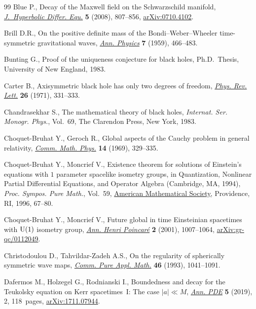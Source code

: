 \documentclass[pdftex]{sigma}
\numberwithin{equation}{section}
\begin{document}
\begin{thebibliography}{99}
Blue P., Decay of the {M}axwell field on the {S}chwarzschild manifold,
 \href{https://doi.org/10.1142/S0219891608001714}{\textit{J.~Hyperbolic
 Differ. Equ.}} \textbf{5} (2008), 807--856,
 \href{http://arxiv.org/abs/0710.4102}{arXiv:0710.4102}.

Brill D.R., On the positive definite mass of the {B}ondi--{W}eber--{W}heeler
 time-symmetric gravitational waves,
 \href{https://doi.org/10.1016/0003-4916(59)90055-7}{\textit{Ann. Physics}}
 \textbf{7} (1959), 466--483.

Bunting G., Proof of the uniqueness conjecture for black holes, Ph.D.~Thesis, {U}niversity of New England, 1983.

Carter B., Axisymmetric black hole has only two degrees of freedom,
 \href{https://doi.org/10.1103/PhysRevLett.26.331}{\textit{Phys. Rev. Lett.}}
 \textbf{26} (1971), 331--333.

Chandrasekhar S., The mathematical theory of black holes, \textit{Internat.
 Ser. Monogr. Phys.}, Vol.~69, The Clarendon Press, New York, 1983.

Choquet-Bruhat Y., Geroch R., Global aspects of the {C}auchy problem in general
 relativity, \href{https://doi.org/10.1007/BF01645389}{\textit{Comm. Math.
 Phys.}} \textbf{14} (1969), 329--335.

Choquet-Bruhat Y., Moncrief V., Existence theorem for solutions of {E}instein's
 equations with {$1$} parameter spacelike isometry groups, in Quantization,
 Nonlinear Partial Differential Equations, and Operator Algebra ({C}ambridge,
 {MA}, 1994), \textit{Proc. Sympos. Pure Math.}, Vol.~59,
 \href{https://doi.org/10.1090/pspum/059/1392984}{American Mathematical
 Society}, Providence, RI, 1996, 67--80.

Choquet-Bruhat Y., Moncrief V., Future global in time {E}insteinian spacetimes
 with {${\rm U}(1)$} isometry group,
 \href{https://doi.org/10.1007/s00023-001-8602-5}{\textit{Ann. Henri
 Poincar\'e}} \textbf{2} (2001), 1007--1064,
 \href{http://arxiv.org/abs/gr-qc/0112049}{arXiv:gr-qc/0112049}.

Christodoulou D., Tahvildar-Zadeh A.S., On the regularity of spherically
 symmetric wave maps,
 \href{https://doi.org/10.1002/cpa.3160460705}{\textit{Comm. Pure Appl.
 Math.}} \textbf{46} (1993), 1041--1091.

Dafermos M., Holzegel G., Rodnianski I., Boundedness and decay for the
 {T}eukolsky equation on {K}err spacetimes~{I}: {T}he case {$|a|\ll M$},
 \href{https://doi.org/10.1007/s40818-018-0058-8}{\textit{Ann. PDE}}
 \textbf{5} (2019), 2, 118~pages,
 \href{http://arxiv.org/abs/1711.07944}{arXiv:1711.07944}.


\end{thebibliography}
\end{document}
